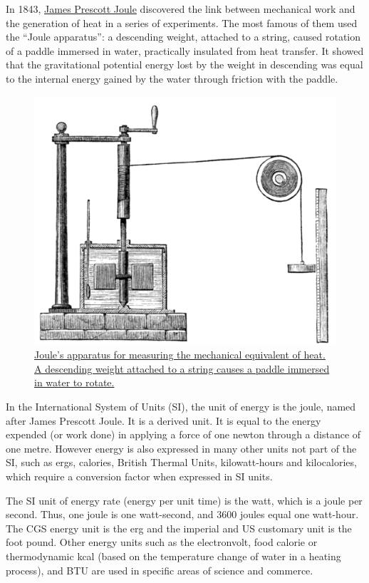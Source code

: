 In 1843, \href{https://en.wikipedia.org/wiki/James_Prescott_Joule}{James Prescott Joule} discovered the link between mechanical work and the generation of heat in a series of experiments. The most famous of them used the ``Joule apparatus'': a descending weight, attached to a string, caused rotation of a paddle immersed in water, practically insulated from heat transfer. It showed that the gravitational potential energy lost by the weight in descending was equal to the internal energy gained by the water through friction with the paddle.



\begin{figure}

{\centering \includegraphics[width=0.7\linewidth]{./figures/chemistry/Joules_Apparatus_Harpers_Scan} 

}

\caption{\href{https://commons.wikimedia.org/wiki/File:Joule\%27s_Apparatus_(Harper\%27s_Scan).png}{Joule's apparatus for measuring the mechanical equivalent of heat. A descending weight attached to a string causes a paddle immersed in water to rotate.}}\label{fig:jouleapparatus}
\end{figure}

In the International System of Units (SI), the unit of energy is the joule, named after James Prescott Joule. It is a derived unit. It is equal to the energy expended (or work done) in applying a force of one newton through a distance of one metre. However energy is also expressed in many other units not part of the SI, such as ergs, calories, British Thermal Units, kilowatt-hours and kilocalories, which require a conversion factor when expressed in SI units.

The SI unit of energy rate (energy per unit time) is the watt, which is a joule per second. Thus, one joule is one watt-second, and 3600 joules equal one watt-hour. The CGS energy unit is the erg and the imperial and US customary unit is the foot pound. Other energy units such as the electronvolt, food calorie or thermodynamic kcal (based on the temperature change of water in a heating process), and BTU are used in specific areas of science and commerce.

